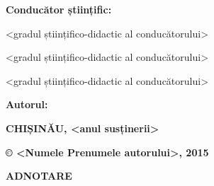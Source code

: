\documentclass[a4paper, 12pt]{report}
\begin{document}
\vspace*{5mm}

{\bf Conducător științific:} \hspace*{3.5cm}{\bf <Numele Prenumele conducătorului>}

\hspace*{8cm}
<gradul științifico-didactic al conducătorului>

\hspace*{8cm}
<gradul științifico-didactic al conducătorului>

\hspace*{8cm} 
<gradul științifico-didactic al conducătorului>

\vspace*{0.5cm}
{\bf Autorul: }

\vspace*{2.5cm}

\begin{center}
{\bf \large CHIȘINĂU, <anul susținerii>}
\end{center}

\newpage

\vspace*{10cm}
\centerline {\large \bf \copyright \hspace*{0.2cm} <Numele Prenumele autorului>, 2015}

\newpage

\renewcommand{\contentsname}{\centering CUPRINS}
\tableofcontents

\newpage

\centerline{\bf ADNOTARE}

\end{document}
